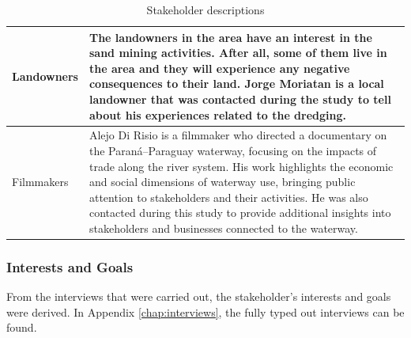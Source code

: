 \begin{table}[H]
\begin{tabularx}{\linewidth}{p{3.5cm}X}
\midrule
Landowners & The landowners in the area have an interest in the sand mining activities. After all, some of them live in the area and they will experience any negative consequences to their land. Jorge Moriatan is a local landowner that was contacted during the study to tell about his experiences related to the dredging. \\
\midrule
Filmmakers & Alejo Di Risio is a filmmaker who directed a documentary on the Paraná–Paraguay waterway, focusing on the impacts of trade along the river system. His work highlights the economic and social dimensions of waterway use, bringing public attention to stakeholders and their activities. He was also contacted during this study to provide additional insights into stakeholders and businesses connected to the waterway. \\
\bottomrule
\end{tabularx}
\caption{Stakeholder descriptions}
\label{tab:stakeholders-description}
\end{table}

\subsubsection{Interests and Goals}
From the interviews that were carried out, the stakeholder's interests and goals were derived. In Appendix \ref{chap:interviews}, the fully typed out interviews can be found.

